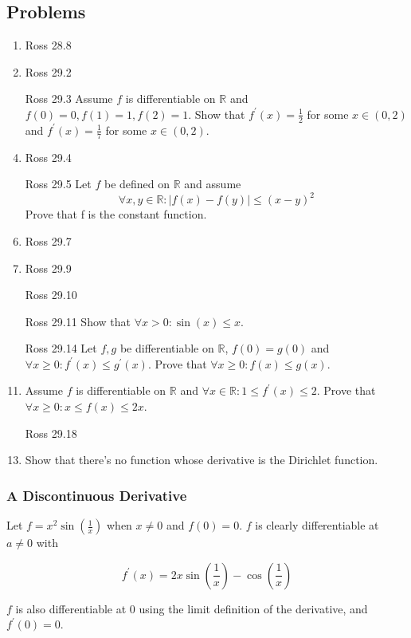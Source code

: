 \documentclass{article}
\theoremstyle{definition}
\newcommand{\R}{\mathbb{R}}
\newcommand{\fdiff}{f^{\prime}}
\begin{document}
\subsection{Problems}

\begin{enumerate}
    \item Ross 28.8
    \item Ross 29.2
    \item[Ross 29.3] Assume $f$ is differentiable on $\R$ and $f(0) = 0, f(1) = 1, f(2) = 1$.
    Show that $\fdiff(x) = \frac{1}{2}$ for some $x \in (0,2)$ and 
    $\fdiff(x) = \frac{1}{7}$ for some $x \in (0,2)$.
    \item Ross 29.4 
    \item[Ross 29.5] Let $f$ be defined on $\R$ and assume 
    \[\forall x,y \in \R: \lvert f(x) - f(y) \rvert \leq (x - y)^{2} \]
    Prove that f is the constant function.
    \item Ross 29.7
    \item Ross 29.9
    \item[Ross 29.10] 
    \item[Ross 29.11] Show that $\forall x > 0: \sin(x) \leq x$.
    \item[Ross 29.14] Let $f,g$ be differentiable on $\R$, $f(0) = g(0)$ and 
    $\forall x \geq 0: \fdiff(x) \leq g^{\prime}(x)$. Prove that $\forall x \geq 0: f(x) \leq g(x)$.
    \item Assume $f$ is differentiable on $\R$ and $\forall x \in \R: 1 \leq f^{\prime}(x) \leq 2$.
    Prove that $\forall x \geq 0: x \leq f(x) \leq 2x$.
    \item[Ross 29.18] 
    \item Show that there's no function whose derivative is the Dirichlet function. 

\end{enumerate}

\subsubsection{A Discontinuous Derivative}

Let $f = x^{2}\sin(\frac{1}{x})$ when $x \neq 0$ and $f(0) = 0$. 
$f$ is clearly differentiable at $a \neq 0$ with 

\[ \fdiff(x) = 2x \sin(\frac{1}{x}) - \cos(\frac{1}{x})\]

$f$ is also differentiable at $0$ using the limit definition of the derivative,
and $\fdiff(0) = 0$.
\end{document}
